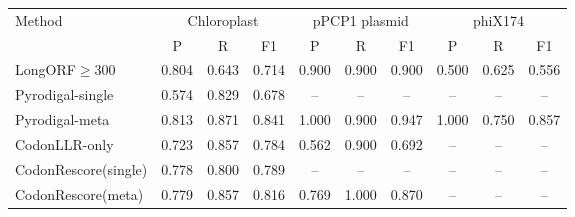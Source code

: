 \begin{tabular}{lccccccccc}
\toprule
Method & \multicolumn{3}{c}{Chloroplast} & \multicolumn{3}{c}{pPCP1 plasmid} & \multicolumn{3}{c}{phiX174} \\
& P & R & F1 & P & R & F1 & P & R & F1 \\
\midrule
LongORF$\geq$300 & 0.804 & 0.643 & 0.714 & 0.900 & 0.900 & 0.900 & 0.500 & 0.625 & 0.556 \\
Pyrodigal-single & 0.574 & 0.829 & 0.678 & -- & -- & -- & -- & -- & -- \\
Pyrodigal-meta & 0.813 & 0.871 & 0.841 & 1.000 & 0.900 & 0.947 & 1.000 & 0.750 & 0.857 \\
CodonLLR-only & 0.723 & 0.857 & 0.784 & 0.562 & 0.900 & 0.692 & -- & -- & -- \\
CodonRescore(single) & 0.778 & 0.800 & 0.789 & -- & -- & -- & -- & -- & -- \\
CodonRescore(meta) & 0.779 & 0.857 & 0.816 & 0.769 & 1.000 & 0.870 & -- & -- & -- \\
\bottomrule
\end{tabular}
